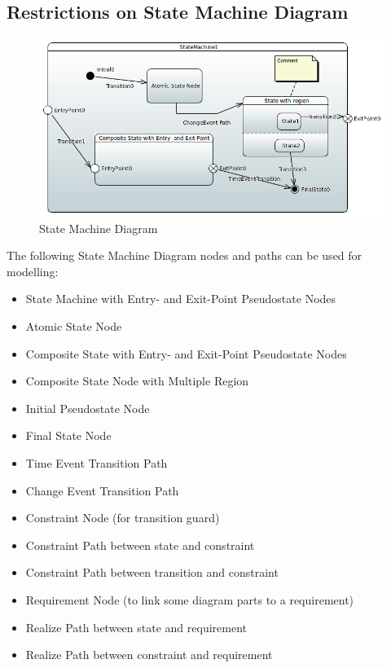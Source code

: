 \subsection{Restrictions on State Machine Diagram}



\begin{figure}[ht]
  \centering
  \includegraphics[width=\textwidth]{images/StateMachineDiagram.PNG}
  \caption{State Machine Diagram}
  \label{fig:sm diagram}
\end{figure}


The following State Machine Diagram nodes and paths can be used for
modelling:
\begin{itemize}
\item State Machine with Entry- and Exit-Point Pseudostate Nodes
\item Atomic State Node
\item Composite State with Entry- and Exit-Point Pseudostate Nodes
\item Composite State Node with Multiple Region
\item Initial Pseudostate Node
\item Final State Node
\item Time Event Transition Path
\item Change Event Transition Path
\item Constraint Node (for transition guard)
\item Constraint Path between state and constraint
\item Constraint Path between transition and constraint
\item Requirement Node (to link some diagram parts to a requirement)
\item Realize Path between state and requirement
\item Realize Path between constraint and requirement
\end{itemize}

